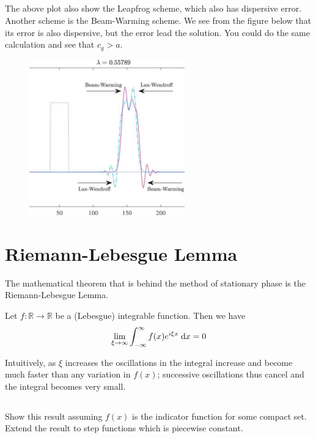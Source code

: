 \documentclass[11pt,letterpaper]{article}
\begin{document}
\subsection{}
The above plot also show the Leapfrog scheme, which also has dispersive error. Another scheme is the Beam-Warming scheme. We see from the figure below that its error is also dispersive, but the error lead the solution. You could do the same calculation and see that $c_g>a$. 
\begin{figure}[H]
    \centering
    \includegraphics[width=0.6\textwidth]{figs/beamwarming}
\end{figure}


\section{Riemann-Lebesgue Lemma}
The mathematical theorem that is behind the method of stationary phase is the Riemann-Lebesgue Lemma. 
\begin{displayquote}
    Let $f:\mathbb{R}\to\mathbb{R}$ be a (Lebesgue) integrable function. Then we have
    \begin{align}
        \lim_{\xi\to\infty} \int^\infty_{-\infty} f(x)e^{i\xi x}\;\mathrm{d} x = 0
    \end{align}
\end{displayquote}
Intuitively, as $\xi$ increases the oscillations in the integral increase and become much faster than any variation in $f(x)$; successive oscillations thus cancel and the integral becomes very small.

\subsection{}
Show this result assuming $f(x)$ is the indicator function for some compact set. Extend the result to step functions which is piecewise constant. 
\end{document}
